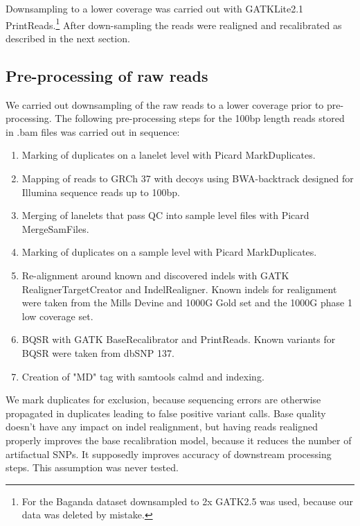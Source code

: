 Downsampling to a lower coverage was carried out with \gls{GATK}Lite2.1 PrintReads.\cite{DePristo2011}\footnote{For the Baganda dataset downsampled to 2x \gls{GATK}2.5 was used, because our data was deleted by mistake.}
After down-sampling the reads were realigned and recalibrated as described in the next section.

\subsection{Pre-processing of raw reads}
We carried out downsampling of the raw reads to a lower coverage prior to pre-processing. The following pre-processing steps for the 100bp length reads stored in .bam files was carried out in sequence:
\begin{enumerate}
\item Marking of duplicates on a lanelet level with Picard MarkDuplicates.
\item Mapping of reads to \gls{GRCh} 37 with decoys using BWA-backtrack\cite{Li15072009} designed for Illumina sequence reads up to 100bp.
\item Merging of lanelets that pass \gls{QC} into sample level files with Picard MergeSamFiles.
\item Marking of duplicates on a sample level with Picard MarkDuplicates.
\item Re-alignment around known and discovered indels with \gls{GATK} RealignerTargetCreator and IndelRealigner. Known indels for realignment were taken from the Mills Devine and \gls{1000G} Gold set and the 1000G phase 1 low coverage set.
\item \Gls{BQSR} with \gls{GATK} BaseRecalibrator and PrintReads. Known variants for \gls{BQSR} were taken from dbSNP 137.
\item Creation of "MD" tag with samtools calmd and indexing.
\end{enumerate}

We mark duplicates for exclusion, because sequencing errors are otherwise propagated in duplicates leading to false positive variant calls. Base quality doesn't have any impact on indel realignment, but having reads realigned properly improves the base recalibration model, because it reduces the number of artifactual \glspl{SNP}. It supposedly improves accuracy of downstream processing steps. This assumption was never tested.

